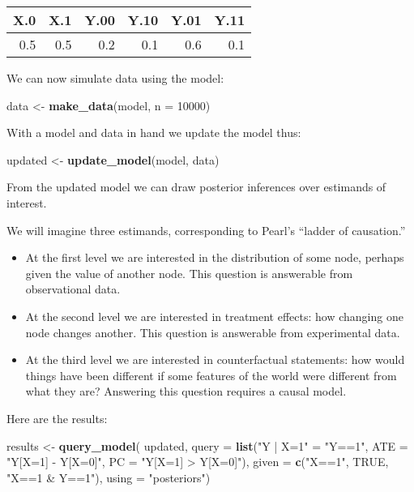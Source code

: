 \documentclass[
  12pt,
]{book}
\newenvironment{Shaded}{\begin{snugshade}}{\end{snugshade}}
\newcommand{\DataTypeTok}[1]{\textcolor[rgb]{0.13,0.29,0.53}{#1}}
\newcommand{\DecValTok}[1]{\textcolor[rgb]{0.00,0.00,0.81}{#1}}
\newcommand{\KeywordTok}[1]{\textcolor[rgb]{0.13,0.29,0.53}{\textbf{#1}}}
\newcommand{\NormalTok}[1]{#1}
\newcommand{\OtherTok}[1]{\textcolor[rgb]{0.56,0.35,0.01}{#1}}
\newcommand{\StringTok}[1]{\textcolor[rgb]{0.31,0.60,0.02}{#1}}
\begin{document}
\begin{tabular}{r|r|r|r|r|r}
\hline
X.0 & X.1 & Y.00 & Y.10 & Y.01 & Y.11\\
\hline
0.5 & 0.5 & 0.2 & 0.1 & 0.6 & 0.1\\
\hline
\end{tabular}

We can now simulate data using the model:

\begin{Shaded}
\begin{Highlighting}[]
\NormalTok{data <-}\StringTok{ }\KeywordTok{make_data}\NormalTok{(model, }\DataTypeTok{n =} \DecValTok{10000}\NormalTok{)}
\end{Highlighting}
\end{Shaded}

With a model and data in hand we update the model thus:

\begin{Shaded}
\begin{Highlighting}[]
\NormalTok{updated <-}\StringTok{ }\KeywordTok{update_model}\NormalTok{(model, data)}
\end{Highlighting}
\end{Shaded}

From the updated model we can draw posterior inferences over estimands of interest.

We will imagine three estimands, corresponding to Pearl's ``ladder of causation.''

\begin{itemize}
\item
  At the first level we are interested in the distribution of some node, perhaps given the value of another node. This question is answerable from observational data.
\item
  At the second level we are interested in treatment effects: how changing one node changes another. This question is answerable from experimental data.
\item
  At the third level we are interested in counterfactual statements: how would things have been different if some features of the world were different from what they are? Answering this question requires a causal model.
\end{itemize}

Here are the results:

\begin{Shaded}
\begin{Highlighting}[]
\NormalTok{results <-}\StringTok{ }\KeywordTok{query_model}\NormalTok{(}
\NormalTok{ updated,}
 \DataTypeTok{query =} \KeywordTok{list}\NormalTok{(}\StringTok{"Y | X=1"}\NormalTok{ =}\StringTok{ "Y==1"}\NormalTok{, }
              \DataTypeTok{ATE =} \StringTok{"Y[X=1] - Y[X=0]"}\NormalTok{, }
              \DataTypeTok{PC  =} \StringTok{"Y[X=1] > Y[X=0]"}\NormalTok{),}
 \DataTypeTok{given =} \KeywordTok{c}\NormalTok{(}\StringTok{"X==1"}\NormalTok{, }\OtherTok{TRUE}\NormalTok{, }\StringTok{"X==1 & Y==1"}\NormalTok{),}
 \DataTypeTok{using =} \StringTok{"posteriors"}\NormalTok{)}
\end{Highlighting}
\end{Shaded}
\end{document}
